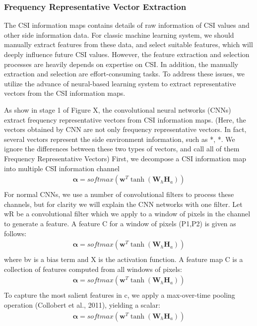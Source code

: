\documentclass[10pt,journal,cspaper,compsoc]{IEEEtran}
\begin{document}
\subsubsection{Frequency Representative Vector Extraction}
The CSI information maps contains details of raw information of CSI values and other side information data. For classic machine learning system, we should manually extract features from these data, and select suitable features, which will deeply influence future CSI values. However, the feature extraction and selection processes are heavily depends on expertise on CSI. In addition, the manually extraction and selection are effort-consuming tasks. To address these issues, we utilize the advance of neural-based learning system to extract representative vectors from the CSI information maps.

As show in stage 1 of Figure X, the convolutional neural networks (CNNs) extract frequency representative vectors from CSI information maps. (Here, the vectors obtained by CNN are not only frequency representative vectors. In fact, several vectors represent the side environment information, such as *, *.  We ignore the differences between these two types of vectors, and call all of them Frequency Representative Vectors) First, we decompose a CSI information map into multiple CSI information channel
\begin{eqnarray}
	\mathbf{\alpha}  = softmax \left( {{\mathbf{w}^T}\tanh({\mathbf{W}_h}\mathbf{H}_a)} \right)\label{eq:9}\\
\end{eqnarray}
For normal CNNs, we use a number of convolutional filters to process these channels, but for clarity we will explain the CNN networks with one filter. Let wR be a convolutional filter which we apply to a window of pixels in the channel to generate a feature.  A feature C for a window of pixels (P1,P2) is given as follows:
\begin{eqnarray}
	\mathbf{\alpha}  = softmax \left( {{\mathbf{w}^T}\tanh({\mathbf{W}_h}\mathbf{H}_a)} \right)\label{eq:9}\\
\end{eqnarray}
where bv is a bias term and X is the activation function.  A feature map C is a collection of features computed from all windows of pixels:
\begin{eqnarray}
	\mathbf{\alpha}  = softmax \left( {{\mathbf{w}^T}\tanh({\mathbf{W}_h}\mathbf{H}_a)} \right)\label{eq:9}\\
\end{eqnarray}
To capture the most salient features in c, we apply a max-over-time pooling operation (Collobert et al., 2011), yielding a scalar:
\begin{eqnarray}
	\mathbf{\alpha}  = softmax \left( {{\mathbf{w}^T}\tanh({\mathbf{W}_h}\mathbf{H}_a)} \right)\label{eq:9}\\
\end{eqnarray}
\end{document}
